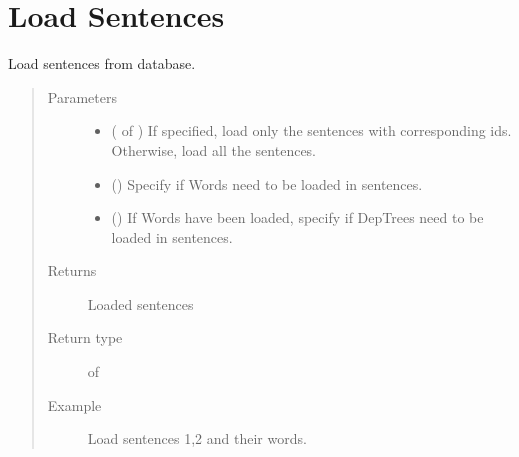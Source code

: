 \documentclass[letterpaper,10pt,english]{sphinxmanual}
\begin{document}
\section{Load Sentences}
\label{\detokenize{load:module-loacore.load.sentence_load}}\label{\detokenize{load:load-sentences}}

\begin{fulllineitems}
\label{\detokenize{load:loacore.load.sentence_load.load_sentences}}
Load sentences from database.
\begin{quote}\begin{description}
\item[{Parameters}] \leavevmode\begin{itemize}
\item {} 
 ( of ) \textendash{} If specified, load only the sentences with corresponding ids. Otherwise, load all the sentences.

\item {} 
 () \textendash{} Specify if Words need to be loaded in sentences.

\item {} 
 () \textendash{} If Words have been loaded, specify if DepTrees need to be loaded in sentences.

\end{itemize}

\item[{Returns}] \leavevmode
Loaded sentences

\item[{Return type}] \leavevmode
{} of {\hyperref[\detokenize{classes:loacore.classes.classes.Sentence}]{}}

\item[{Example}] \leavevmode
Load sentences 1,2 and their words.


\end{description}
\end{quote}
\end{fulllineitems}
\end{document}
